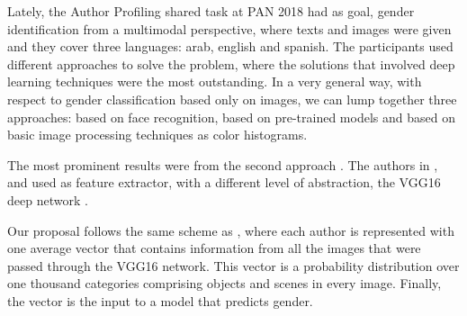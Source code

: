 \documentclass[runningheads]{llncs}
\begin{document}
Lately, the Author Profiling shared task at PAN 2018 had as goal, 
gender identification from a multimodal perspective, where texts and images were 
given and they cover three languages: arab, english and spanish.
The participants used different approaches to solve the problem,
where the solutions that involved deep learning techniques were the most outstanding.
In a very general way, with respect to gender classification based only on images, we can lump
together three approaches: based on face recognition, based on pre-trained models
and based on basic image processing techniques as color histograms.

The most prominent results were from the second approach \cite{rangel_rosso_montes-y-gomez_potthast_stein}. The authors in 
\cite{aragon2018straightforward}, 
\cite{takahashi_tahara_nagatan_miura_taniguchi_ohkuma} and \cite{sierra_gonzales}
used as feature extractor, with a different level of abstraction, the
VGG16 deep network \cite{zisserman_simonyan_2015}.

Our proposal follows the same scheme as \cite{aragon2018straightforward}, 
where each author is represented with one average vector that contains
information from all the images that were passed through the VGG16 network.
This vector is a probability distribution over one thousand categories
comprising objects and scenes in every image. Finally, the vector is the input to a model that predicts gender.


\end{document}
